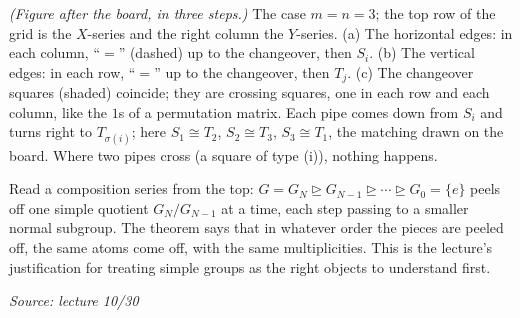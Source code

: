 \documentclass[11pt]{report}
\newcommand{\srcline}[1]{\par\hfill{\footnotesize\textit{Source: #1}}}
\begin{document}
\begin{center}
\end{center}

\textit{(Figure after the board, in three steps.)} The case $m = n = 3$; the top row of the grid is the $X$-series and the right column the $Y$-series. (a) The horizontal edges: in each column, ``$=$'' (dashed) up to the changeover, then $S_i$. (b) The vertical edges: in each row, ``$=$'' up to the changeover, then $T_j$. (c) The changeover squares (shaded) coincide; they are crossing squares, one in each row and each column, like the $1$s of a permutation matrix. Each pipe comes down from $S_i$ and turns right to $T_{\sigma(i)}$; here $S_1 \cong T_2$, $S_2 \cong T_3$, $S_3 \cong T_1$, the matching drawn on the board. Where two pipes cross (a square of type (i)), nothing happens.



\begin{rembox}\label{rem:jh-peeling}
Read a composition series from the top: $G = G_N \trianglerighteq G_{N-1} \trianglerighteq \cdots \trianglerighteq G_0 = \{e\}$ peels off one simple quotient $G_N/G_{N-1}$ at a time, each step passing to a smaller normal subgroup. The theorem says that in whatever order the pieces are peeled off, the same atoms come off, with the same multiplicities. This is the lecture's justification for treating simple groups as the right objects to understand first.
\srcline{lecture 10/30}
\end{rembox}
\end{document}
